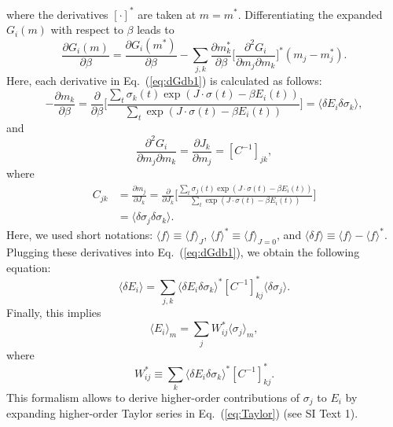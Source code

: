 \documentclass[prx,twocolumn,twoside,showpacs,superscriptaddress]{revtex4-1}
\begin{document}
{where the derivatives $[\cdot]^*$ are taken at $m=m^*$.
Differentiating the expanded $G_i(m)$ with respect to $\beta$ leads to
\begin{equation}
\label{eq:dGdb1}
\frac{\partial G_i(m)}{\partial \beta} = \frac{\partial G_i(m^*)}{\partial \beta} - \sum_{j,k} \frac{\partial m_k^* }{\partial \beta} \bigg[ \frac{\partial^2 G_i}{\partial m_j \partial m_k} \bigg]^* (m_j-m_j^*).
\end{equation}
Here, each derivative in Eq.~(\ref{eq:dGdb1}) is calculated as follows:
\begin{equation}
-\frac{\partial m_k}{\partial \beta} = \frac{\partial}{\partial \beta} \bigg[ \frac{\sum_{t} \sigma_k(t) \exp (J\cdot \sigma(t) - \beta E_i(t))}{\sum_{t} \exp (J\cdot \sigma(t) - \beta E_i(t))} \bigg] =\langle \delta E_i \delta \sigma_k \rangle,
\end{equation}
and
\begin{equation}
\frac{\partial^2 G_i}{\partial m_j \partial m_k} = \frac{\partial J_k}{\partial m_j}=[C^{-1}]_{jk},
\end{equation}
where 
\begin{align}
C_{jk} &= \frac{\partial m_j}{\partial J_k}= \frac{\partial}{\partial J_k} \bigg[ \frac{\sum_{t} \sigma_j(t) \exp (J\cdot \sigma(t) - \beta E_i(t))}{\sum_{t} \exp (J\cdot \sigma(t) - \beta E_i(t))} \bigg] \nonumber \\
& =\langle \delta \sigma_j \delta \sigma_k \rangle.
\end{align}
Here, we used short notations: $\langle f \rangle \equiv \langle f \rangle_{J}$, $\langle f \rangle^* \equiv \langle f \rangle_{J=0}$,
and $\langle \delta f \rangle \equiv \langle f \rangle - \langle f \rangle^*$.
Plugging these derivatives into Eq.~(\ref{eq:dGdb1}), we obtain the following equation:
\begin{equation}
\langle \delta E_i \rangle = \sum_{j,k} \langle \delta E_i \delta \sigma_k \rangle^* [C^{-1}]^*_{kj} \langle \delta \sigma_j \rangle.
\end{equation}
Finally, this implies
\begin{equation}
\label{eq:H}
\langle E_i \rangle_m = \sum_j W_{ij}^* \langle \sigma_j \rangle_m,
\end{equation}
where 
\begin{equation}
\label{eq:W}
W_{ij}^* \equiv \sum_{k} \langle \delta E_i \delta \sigma_k \rangle^* [C^{-1}]^*_{kj}.
\end{equation}
This formalism allows to derive higher-order contributions of $\sigma_j$ to $E_i$ by expanding higher-order Taylor series in Eq.~(\ref{eq:Taylor}) (see SI Text 1).
}
\end{document}
